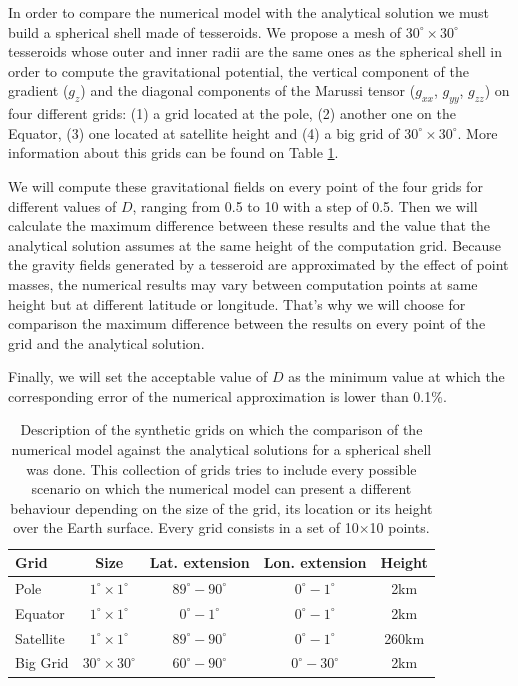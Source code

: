 \documentclass[extra]{gji}
\begin{document}
In order to compare the numerical model with the analytical solution we
must build a spherical shell made of tesseroids.
We propose a mesh of $30^\circ \times 30^\circ$ tesseroids whose outer and
inner radii are the same ones as the spherical shell in order to compute
the gravitational potential, the vertical component of the gradient
($g_z$) and the diagonal components of the Marussi tensor ($g_{xx}$,
$g_{yy}$, $g_{zz}$) on four different grids: (1) a grid located at the
pole, (2) another one on the Equator, (3) one located at satellite
height and (4) a big grid of $30^\circ \times 30^\circ$.
More information about this grids can be found on Table
\ref{tab:grids}.

We will compute these gravitational fields on every point of the four
grids for different values of $D$, ranging from 0.5 to 10 with a step
of 0.5.
Then we will calculate the maximum difference between these results and the
value that the analytical solution assumes at the same height of the
computation grid.
Because the gravity fields generated by a tesseroid are approximated by
the effect of point masses, the numerical results may vary between
computation points at same height but at different latitude or
longitude.
That's why we will choose for comparison the maximum difference between the
results on every point of the grid and the analytical solution.

Finally, we will set the acceptable value of $D$ as the minimum value
at which the corresponding error of the numerical approximation is
lower than 0.1\%.

\begin{table}
\caption{
    Description of the synthetic grids on which the comparison of the
    numerical model against the analytical solutions for a spherical
    shell was done.
    This collection of grids tries to include every possible scenario
    on which the numerical model can present a different behaviour
    depending on the size of the grid, its location or its height over
    the Earth surface. Every grid consists in a set of 10$\times$10
    points.
}
\label{tab:grids}
\begin{tabular}{lcccc}
    Grid & Size & Lat. extension & Lon. extension & Height \\ \hline
    Pole & $1^\circ \times 1^\circ$ & $89^\circ - 90^\circ$ &
        $0^\circ - 1^\circ$ & 2km \\
    Equator & $1^\circ \times 1^\circ$ & $0^\circ - 1^\circ$ &
        $0^\circ - 1^\circ$ & 2km \\
    Satellite & $1^\circ \times 1^\circ$ & $89^\circ - 90^\circ$ &
        $0^\circ - 1^\circ$ & 260km \\
    Big Grid & $30^\circ \times 30^\circ$ & $60^\circ - 90^\circ$ &
        $0^\circ - 30^\circ$ & 2km \\
\end{tabular}
\end{table}
\end{document}
